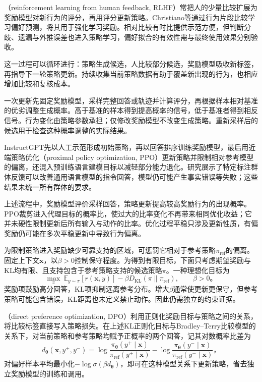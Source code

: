 （reinforcement learning from human feedback, RLHF）常把人的少量比较扩展为奖励模型对新行为的评分，再用评分更新策略。Christiano等通过行为片段比较学习偏好预测，将其用于强化学习奖励。相对比较有时比提供示范方便，但判断分歧、遗漏与外推误差也进入策略学习，偏好拟合的有效性需与最终使用效果分别验收。

这一过程可以循环进行：策略生成候选，人比较部分候选，奖励模型吸收新标签，再指导下一轮策略更新。持续收集当前策略数据有助于覆盖新出现的行为，也相应增加比较和复核成本。

一次更新先固定奖励模型，采样完整回答或轨迹并计算评分，再根据样本相对基准的优劣调整生成概率。高于基准的样本得到提高概率的信号，低于基准者得到相反信号。行为变化由策略参数承担；仅修改奖励模型不改变生成策略。重新采样后的候选用于检查这种概率调整的实际结果。

InstructGPT先以人工示范形成初始策略，再以回答排序训练奖励模型，最后用近端策略优化（proximal policy optimization, PPO）更新策略并限制相对参考模型的偏离，还混入预训练语言建模目标以减轻部分能力退化。研究展示了特定标注群体反馈可以改善通用语言模型的指令回答，模型仍可能产生事实错误等失败；这些结果未统一所有群体的要求。

上述流程中，奖励模型评价采样回答，策略更新提高较高奖励行为的出现概率。PPO裁剪进入代理目标的概率比，使过大的比率变化不再带来相同优化收益；它并未硬性限制更新后所有输入与动作的比率。优化过程平稳只涉及更新性质，有偏奖励仍可能在多次平稳更新中导致行为偏离。

为限制策略进入奖励缺少可靠支持的区域，可惩罚它相对于参考策略$\pi_{\mathrm{ref}}$的偏离。固定上下文$\bm{x}$，以$\beta>0$控制保守程度。为得到有限目标，下面只考虑期望奖励与KL均有限、且支持包含于参考策略支持的候选策略$\pi$。一种理想化目标为
\begin{equation}
 \max_\pi\
 \mathbb E_{y\sim\pi}[r(\bm{x},y)]
 -\beta D_{\mathrm{KL}}(\pi\|\pi_{\mathrm{ref}}),
 \qquad \beta>0\text{。}
 \label{eq:alignment-kl-objective}
\end{equation}
奖励项鼓励高分回答，KL项抑制远离参考分布。增大$\beta$通常使更新更保守，但参考策略可能包含错误，KL距离也未定义禁止动作。因此仍需独立的约束证据。

（direct preference optimization, DPO）利用正则化奖励目标与策略之间的关系，将比较标签直接写入策略损失。在上述KL正则化目标与Bradley--Terry比较模型的关系下，对当前策略和参考策略均赋予正概率的两个回答，记其对数概率比差为
\[
 d_{\bm{\theta}}(\bm{x},y^+,y^-)
 =\log\frac{\pi_{\bm{\theta}}(y^+\mid\bm{x})}
              {\pi_{\mathrm{ref}}(y^+\mid\bm{x})}
 -\log\frac{\pi_{\bm{\theta}}(y^-\mid\bm{x})}
              {\pi_{\mathrm{ref}}(y^-\mid\bm{x})}\text{，}
\]
对偏好样本平均最小化$-\log\sigma(\beta d_{\bm\theta})$，即可在这种模型关系下更新策略，省去独立奖励模型的训练和调用。

